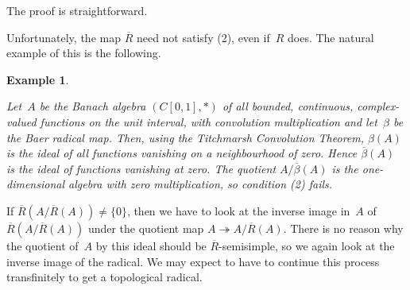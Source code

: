 \documentclass[11pt]{article}
\newcounter{arbenum}
\newenvironment{arbenumerate}{\begin{list}{{\rm(\arabic{arbenum})}}%
{\usecounter{arbenum}}}{\end{list}}
\newcommand{\sseq}{\subseteq}
\newcommand{\closure}[1]{\overline{#1}}
\newcommand{\onto}{\twoheadrightarrow}
\newcommand{\idealin}{\lhd}
\newenvironment{Proof}{{\it Proof. }}{}%
\newtheorem{example}[thm]{Example}
\newenvironment{Example}{\begin{example}\begin{rm}}{\end{rm}\end{example}}
\newcommand{\Detail}[1]{}
\newcommand{\Rbar}{\overline{R}}
\begin{document}
The proof is straightforward.
\Detail{\begin{Proof}
The map~$R$ has the algebraic properties (1), (3) and (4).  We must prove
the topological versions of (1), (3) and (4) for $\Rbar$.
\begin{arbenumerate}
\item The set $R(A)$ is an ideal of~$A$ and hence of $\Rbar(A)$.   Therefore,
by (2) and (4), $R(A) = R(R(A)) \sseq R(\Rbar(A))$.  Taking closures, we get
$\Rbar(A) \sseq \Rbar(\Rbar(A))$. The reverse inclusion is trivial.
\addtocounter{arbenum}{1}
\item If $\phi:A \onto B$ is a continuous epimorphism,
then $\phi(R(A)) \sseq R(B)$, by (3), so
$\phi(\Rbar(A)) \sseq \closure{\phi(R(A))} \sseq \Rbar(B).$
\item
If $I$ is a closed ideal of~$A$ then $R(I) \idealin A$ by (4)(a) and
$\Rbar(I)$, which is defined as the closure of $R(I)$ in~$I$, is the closure
of $R(I)$ in~$A$.  Therefore $\Rbar(I)$ is a closed ideal of~$A$.
Moreover, by (4)(b), $R(I) \sseq R(A) \cap I \sseq \Rbar(A) \cap I$.
Now $\Rbar(A) \cap I$ is closed in $I$, so $\Rbar(I) \sseq \Rbar(A) \cap I$.
\end{arbenumerate}
\end{Proof}}
Unfortunately, the map $\Rbar$ need not satisfy (2), even if~$R$ does.
The natural example of this is the following.

\begin{Example}\label{C01}
Let~$A$ be the Banach algebra $(C[0,1],*)$ of all bounded, continuous,
complex-valued functions on the unit interval, with convolution multiplication
and let~$\beta$ be the Baer radical map.   Then, using the Titchmarsh
Convolution Theorem, $\beta(A)$ is the ideal of all functions vanishing on a
neighbourhood of zero.   Hence $\overline{\beta}(A)$ is the ideal of
functions vanishing at zero.   The quotient $A/\overline{\beta}(A)$ is
the one-dimensional algebra with zero multiplication, so
condition (2) fails.
\end{Example}

If $\Rbar(A/\Rbar(A)) \neq \{0\}$, then we have to look at the inverse image
in~$A$ of $\Rbar(A/\Rbar(A))$ under the quotient map $A \onto A/\Rbar(A)$.
There is no reason why the quotient of~$A$ by this ideal should be
$\Rbar$-semisimple, so we again look at the inverse image of the radical.
We may expect to have to continue this process transfinitely to get
a topological radical.
\end{document}
